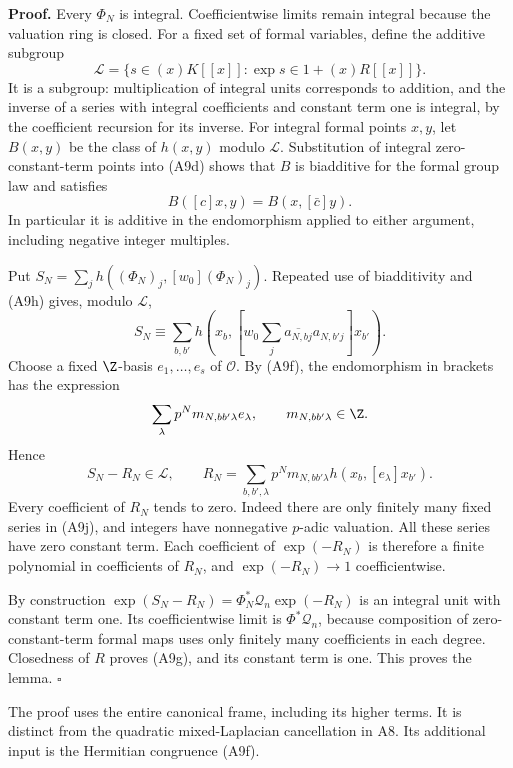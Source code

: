 \documentclass[11pt]{article}
\theoremstyle{definition}\newtheorem{definition}[theorem]{Definition}\newtheorem{remark}[theorem]{Remark}
\begin{document}
\textbf{Proof.}
Every $\Phi_N$ is integral.  Coefficientwise limits remain
integral because the valuation ring is closed.
For a fixed set of formal variables, define the additive
subgroup
\[
 \mathcal L
  =\{s\in(x)K[[x]]:\exp s\in1+(x)R[[x]]\}.
\]
It is a subgroup: multiplication of integral units corresponds
to addition, and the inverse of a series with integral
coefficients and constant term one is integral, by the
coefficient recursion for its inverse.
For integral formal points $x,y$, let $B(x,y)$ be the class of
$h(x,y)$ modulo $\mathcal L$.  Substitution of integral
zero-constant-term points into (A9d) shows that $B$ is
biadditive for the formal group law and satisfies
\[
             B([c]x,y)=B(x,[\bar c]y).
 \tag{A9h}
\]
In particular it is additive in the endomorphism applied to
either argument, including negative integer multiples.

Put $S_N=\sum_j h((\Phi_N)_j,[w_0](\Phi_N)_j)$.
Repeated use of biadditivity and (A9h) gives, modulo
$\mathcal L$,
\[
 S_N\equiv
  \sum_{b,b'}h\left(x_b,
       \left[w_0\sum_j\overline{a_{N,bj}}a_{N,b'j}\right]x_{b'}
            \right).
 \tag{A9i}
\]
Choose a fixed $\Z$-basis $e_1,\ldots,e_s$ of $\mathcal O$.
By (A9f), the endomorphism in brackets has the expression
\[
 \sum_\lambda p^N m_{N,bb'\lambda}e_\lambda,
 \qquad m_{N,bb'\lambda}\in\Z.
\]
Hence
\[
 S_N-R_N\in\mathcal L,\qquad
 R_N=\sum_{b,b',\lambda}
       p^N m_{N,bb'\lambda}h(x_b,[e_\lambda]x_{b'}).
 \tag{A9j}
\]
Every coefficient of $R_N$ tends to zero.  Indeed there are
only finitely many fixed series in (A9j), and integers have
nonnegative $p$-adic valuation.  All these series have zero
constant term.  Each coefficient of $\exp(-R_N)$ is therefore
a finite polynomial in coefficients of $R_N$, and
$\exp(-R_N)\to1$ coefficientwise.

By construction
$\exp(S_N-R_N)=\Phi_N^*\mathcal Q_n\exp(-R_N)$ is an integral
unit with constant term one.  Its coefficientwise limit is
$\Phi^*\mathcal Q_n$, because composition of zero-constant-term
formal maps uses only finitely many coefficients in each
degree.  Closedness of $R$ proves (A9g), and its constant term
is one.  This proves the lemma. \hfill$\square$

The proof uses the entire canonical frame, including its
higher terms.  It is distinct from the quadratic
mixed-Laplacian cancellation in A8.  Its additional input is
the Hermitian congruence (A9f).
\end{document}
